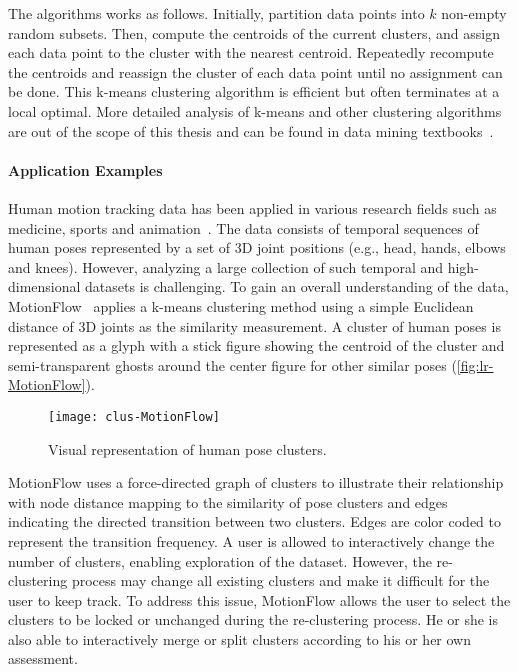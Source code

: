 The algorithms works as follows. Initially, partition data points into $k$ non-empty random subsets. Then, compute the centroids of the current clusters, and assign each data point to the cluster with the nearest centroid. Repeatedly recompute the centroids and reassign the cluster of each data point until no assignment can be done. This k-means clustering algorithm is efficient but often terminates at a local optimal. More detailed analysis of k-means and other clustering algorithms are out of the scope of this thesis and can be found in data mining textbooks~\cite{Tan2006,Han2011}.

\paragraph{Application Examples}
Human motion tracking data has been applied in various research fields such as medicine, sports and animation~\cite{Bernard2013}. The data consists of temporal sequences of human poses represented by a set of 3D joint positions (e.g., head, hands, elbows and knees). However, analyzing a large collection of such temporal and high-dimensional datasets is challenging. To gain an overall understanding of the data, MotionFlow~\cite{Jang2016} applies a k-means clustering method using a simple Euclidean distance of 3D joints as the similarity measurement. A cluster of human poses is represented as a glyph with a stick figure showing the centroid of the cluster and semi-transparent ghosts around the center figure for other similar poses (\autoref{fig:lr-MotionFlow}).

\begin{figure}[!htb]
	\centering
	\texttt{[image: clus-MotionFlow]}
	\caption{Visual representation of human pose clusters. }
	\label{fig:lr-MotionFlow}
\end{figure}

MotionFlow uses a force-directed graph of clusters to illustrate their relationship with node distance mapping to the similarity of pose clusters and edges indicating the directed transition between two clusters. Edges are color coded to represent the transition frequency. A user is allowed to interactively change the number of clusters, enabling exploration of the dataset. However, the re-clustering process may change all existing clusters and make it difficult for the user to keep track. To address this issue, MotionFlow allows the user to select the clusters to be locked or unchanged during the re-clustering process. He or she is also able to interactively merge or split clusters according to his or her own assessment.

